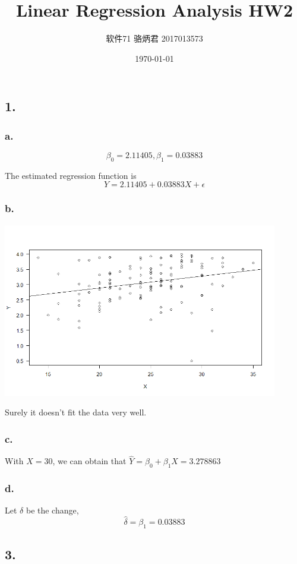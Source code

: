 \documentclass[UTF8]{ctexart}
\title{Linear Regression Analysis HW2}
\author{软件71 骆炳君 2017013573}
\date{\today}
\begin{document}
\maketitle
{}

\subsection{1.}
\subsubsection{a.}
$$\beta_0=2.11405,\beta_1=0.03883$$

The estimated regression function is $$Y=2.11405+0.03883X+\epsilon$$

\subsubsection{b.}
\includegraphics[width=0.90\textwidth]{Rplot01.png}

Surely it doesn't fit the data very well.

\subsubsection{c.}
With $X=30$, we can obtain that $\hat{Y}=\beta_0+\beta_1 X=3.278863$

\subsubsection{d.}
Let $\delta$ be the change,$$\hat{\delta}=\beta_1=0.03883$$

\subsection{3.}
\end{document}
